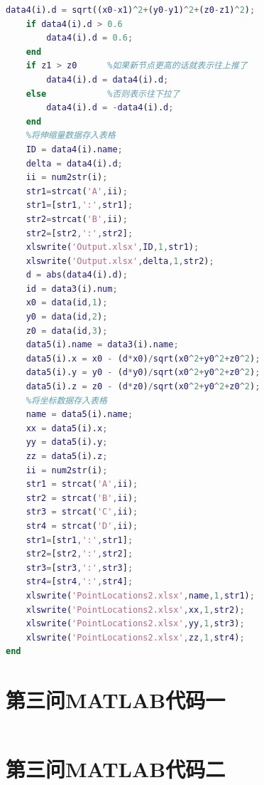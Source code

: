 \documentclass[withoutpreface,bwprint]{cumcmthesis} %
\begin{document}
\begin{appendices}
\begin{lstlisting}[language=matlab]
    data4(i).d = sqrt((x0-x1)^2+(y0-y1)^2+(z0-z1)^2);
    if data4(i).d > 0.6
        data4(i).d = 0.6;
    end
    if z1 > z0      %如果新节点更高的话就表示往上推了
        data4(i).d = data4(i).d;
    else            %否则表示往下拉了
        data4(i).d = -data4(i).d;
    end
    %将伸缩量数据存入表格
    ID = data4(i).name;
    delta = data4(i).d;
    ii = num2str(i);
    str1=strcat('A',ii);
    str1=[str1,':',str1];
    str2=strcat('B',ii);
    str2=[str2,':',str2];
    xlswrite('Output.xlsx',ID,1,str1);
    xlswrite('Output.xlsx',delta,1,str2);
    d = abs(data4(i).d);
    id = data3(i).num;
    x0 = data(id,1);
    y0 = data(id,2);
    z0 = data(id,3);
    data5(i).name = data3(i).name;
    data5(i).x = x0 - (d*x0)/sqrt(x0^2+y0^2+z0^2);
    data5(i).y = y0 - (d*y0)/sqrt(x0^2+y0^2+z0^2);
    data5(i).z = z0 - (d*z0)/sqrt(x0^2+y0^2+z0^2);
    %将坐标数据存入表格
    name = data5(i).name;
    xx = data5(i).x;
    yy = data5(i).y;
    zz = data5(i).z;
    ii = num2str(i);
    str1 = strcat('A',ii);
    str2 = strcat('B',ii);
    str3 = strcat('C',ii);
    str4 = strcat('D',ii);
    str1=[str1,':',str1];
    str2=[str2,':',str2];
    str3=[str3,':',str3];
    str4=[str4,':',str4];
    xlswrite('PointLocations2.xlsx',name,1,str1);
    xlswrite('PointLocations2.xlsx',xx,1,str2);
    xlswrite('PointLocations2.xlsx',yy,1,str3);
    xlswrite('PointLocations2.xlsx',zz,1,str4);
end

\end{lstlisting}
\section{第三问MATLAB代码一}
\begin{lstlisting}[language=matlab]
\end{lstlisting}
\section{第三问MATLAB代码二}
\end{appendices}
\end{document}
